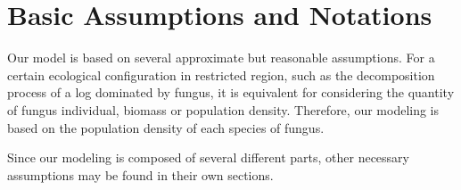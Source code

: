 \section{Basic Assumptions and Notations}\label{sec:assump}

Our model is based on several approximate but reasonable assumptions. For a certain ecological configuration in restricted region, such as the decomposition process of a log dominated by fungus, it is equivalent for considering the quantity of fungus individual, biomass or population density. Therefore, our modeling is based on the population density of each species of fungus.

Since our modeling is composed of several different parts, other necessary assumptions may be found in their own sections.









